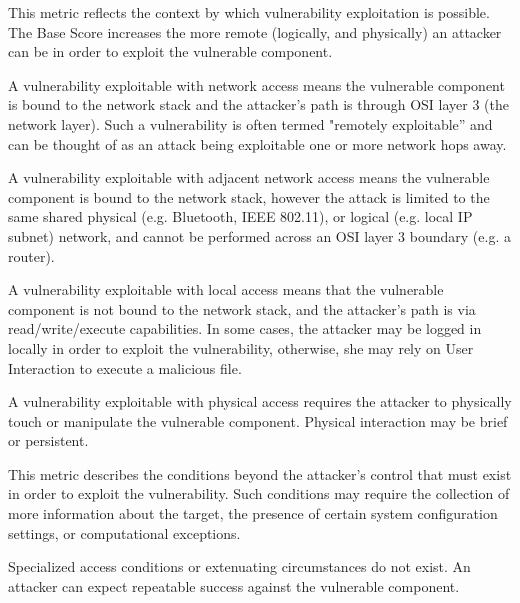     \begin{description}[itemsep=1em,align=left]
        \item [Attack Vector:] This metric reflects the context by which vulnerability exploitation is possible. 
            The Base Score increases the more remote (logically, and physically) an attacker can be in order to exploit the vulnerable component.
            \begin{description}[noitemsep,align=left]
                \item [Network:] A vulnerability exploitable with network access means the vulnerable component is bound to the network stack and the attacker's path is through OSI layer 3 (the network layer). 
                Such a vulnerability is often termed "remotely exploitable” and can be thought of as an attack being exploitable one or more network hops away.
                \item [Adjacent:] A vulnerability exploitable with adjacent network access means the vulnerable component is bound to the network stack, however the attack is limited to the same shared physical (e.g. Bluetooth, IEEE 802.11), or logical (e.g. local IP subnet) network, and cannot be performed across an OSI layer 3 boundary (e.g. a router).
                \item [Local:] A vulnerability exploitable with local access means that the vulnerable component is not bound to the network stack, and the attacker’s path is via read/write/execute capabilities. 
                    In some cases, the attacker may be logged in locally in order to exploit the vulnerability, otherwise, she may rely on User Interaction to execute a malicious file.
                \item [Physical:] A vulnerability exploitable with physical access requires the attacker to physically touch or manipulate the vulnerable component. Physical interaction may be brief or persistent.
            \end{description}
        \item [Attack Complexity:] This metric describes the conditions beyond the attacker’s control that must exist in order to exploit the vulnerability. Such conditions may require the collection of more information about the target, the presence of certain system configuration settings, or computational exceptions.
            \begin{description}[noitemsep,align=left]
                \item [Low:] Specialized access conditions or extenuating circumstances do not exist. An attacker can expect repeatable success against the vulnerable component.

\end{description}
\end{description}
